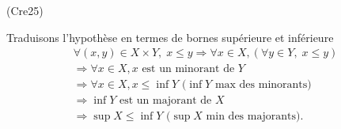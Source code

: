 \begin{tiny}(Cre25)\end{tiny} Traduisons l'hypothèse en termes de bornes supérieure et inférieure
\begin{multline*}
  \forall (x,y) \in X\times Y, \; x \leq y
  \Rightarrow \forall x \in X, \left( \forall y \in Y, \; x \leq y \right)\\
  \Rightarrow \forall x \in X, x \text{ est un minorant de } Y\\
  \Rightarrow \forall x \in X, x \leq \inf Y  \text{ ($\inf Y$ max des minorants)}\\
  \Rightarrow \inf Y \text{ est un majorant de } X \\
  \Rightarrow \sup X \leq \inf Y \text{ ($\sup X$ min des majorants)}.
\end{multline*}
